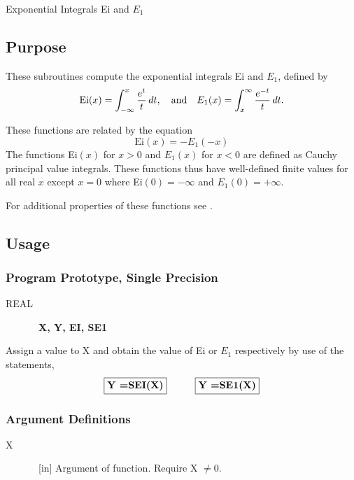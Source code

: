 \documentclass[twoside]{MATH77}
\begin{document}
 Exponential Integrals Ei and $E_1$


\subsection{Purpose}

These subroutines compute the exponential integrals Ei and $E_1$, defined
by%
\begin{equation*}
\text{Ei}(x)=\int_{-\infty }^x\frac{e^t}t\,dt,\quad \text{and\quad }%
E_1(x)=\int_x^\infty \frac{e^{-t}}t\,dt.
\end{equation*}

These functions are related by the equation
\begin{equation*}
\text{Ei}(x) = -E_1(-x)
\end{equation*}
The functions Ei$(x)$ for $x > 0$ and $E_1(x)$ for $x < 0$ are defined as
Cauchy principal value integrals. These functions thus have well-defined
finite values for all real $x$ except $x = 0$ where Ei$(0) = -\infty $ and $%
E_1(0) = +\infty .$

For additional properties of these functions see \cite{ams55:exp-int}.

\subsection{Usage}

\subsubsection{Program Prototype, Single Precision}

\begin{description}
\item[REAL]  \ {\bf X, Y, EI, SE1}
\end{description}

Assign a value to X and obtain the value of Ei or $E_1$ respectively by
use of the statements,
$$
\fbox{{\bf Y =SEI(X)}} \hspace{.4in} \fbox{{\bf Y =SE1(X)}}
$$

\subsubsection{Argument Definitions}

\begin{description}
\item[X]  \ [in] Argument of function. Require X $\neq 0.$
\end{description}
\end{document}

